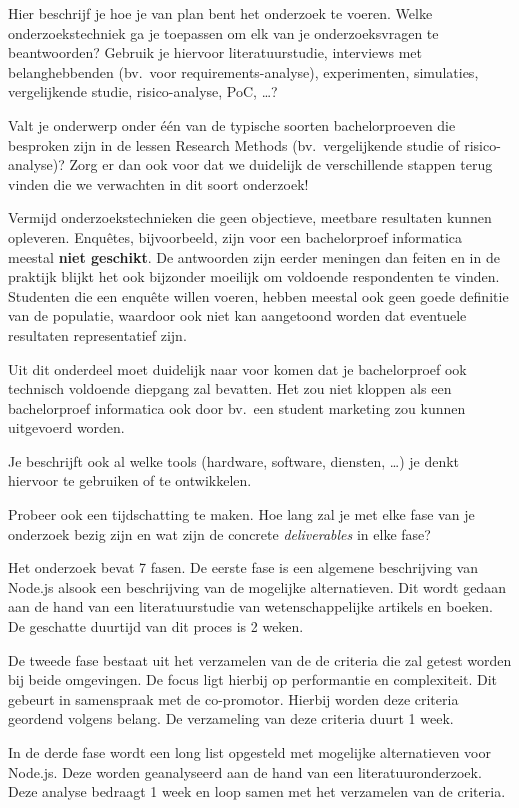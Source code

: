 Hier beschrijf je hoe je van plan bent het onderzoek te voeren. 
Welke onderzoekstechniek ga je toepassen om elk van je onderzoeksvragen te beantwoorden? 
Gebruik je hiervoor literatuurstudie, interviews met belanghebbenden (bv.~voor requirements-analyse),
 experimenten, simulaties, vergelijkende studie, risico-analyse, PoC, \ldots?

Valt je onderwerp onder één van de typische soorten bachelorproeven die besproken zijn in de lessen Research Methods 
(bv.\ vergelijkende studie of risico-analyse)? Zorg er dan ook voor dat we duidelijk de verschillende stappen 
terug vinden die we verwachten in dit soort onderzoek!

Vermijd onderzoekstechnieken die geen objectieve, meetbare resultaten kunnen opleveren. Enquêtes,
 bijvoorbeeld, zijn voor een bachelorproef informatica meestal \textbf{niet geschikt}. 
De antwoorden zijn eerder meningen dan feiten en in de praktijk blijkt het ook bijzonder moeilijk om 
voldoende respondenten te vinden. Studenten die een enquête willen voeren,
 hebben meestal ook geen goede definitie van de populatie,
 waardoor ook niet kan aangetoond worden dat eventuele resultaten representatief zijn.

Uit dit onderdeel moet duidelijk naar voor komen dat je bachelorproef ook technisch voldoen\-de diepgang zal bevatten.
Het zou niet kloppen als een bachelorproef informatica ook door bv.\ een student marketing zou kunnen uitgevoerd worden.

Je beschrijft ook al welke tools (hardware, software, diensten, \ldots) je denkt hiervoor te gebruiken of te ontwikkelen.

Probeer ook een tijdschatting te maken. Hoe lang zal je met elke fase van je onderzoek bezig zijn en wat zijn de concrete
 \emph{deliverables} 
in elke fase?

Het onderzoek bevat 7 fasen.
De eerste fase is een algemene beschrijving van Node.js alsook een beschrijving van de mogelijke alternatieven. 
Dit wordt gedaan aan de hand van een literatuurstudie van wetenschappelijke artikels en boeken. 
De geschatte duurtijd van dit proces is 2 weken.

De tweede fase bestaat uit het verzamelen van de de criteria die zal getest worden bij beide omgevingen. 
De focus ligt hierbij op performantie en complexiteit.
Dit gebeurt in samenspraak met de co-promotor. Hierbij worden deze criteria geordend volgens belang. 
De verzameling van deze criteria duurt 1 week.

In de derde fase wordt een long list opgesteld met mogelijke alternatieven voor Node.js. 
Deze worden geanalyseerd aan de hand van een literatuuronderzoek. Deze analyse bedraagt 1 week en loop samen met het verzamelen van de criteria.

